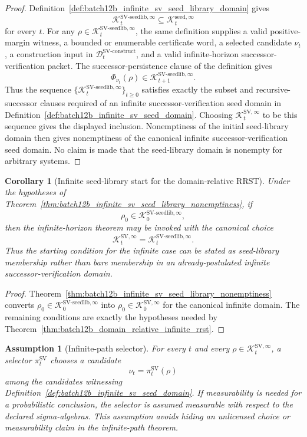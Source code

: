 \documentclass[11pt]{article}
\newtheorem{corollary}[theorem]{Corollary}
\newtheorem{assumption}[theorem]{Assumption}
\newcommand{\1}{\mathbf{1}}
\providecommand{\Dcal}{\mathcal{D}}
\providecommand{\Kcal}{\mathcal{K}}
\begin{document}
\begin{proof}
Definition~\ref{def:batch12b_infinite_sv_seed_library_domain} gives
\[
\Kcal_t^{\mathrm{SV\mbox{-}seedlib},\infty}
\subseteq
\Kcal_t^{\mathrm{seed},\infty}
\]
for every \(t\).  For any \(\rho\in\Kcal_t^{\mathrm{SV\mbox{-}seedlib},\infty}\), the same definition supplies a valid positive-margin witness, a bounded or enumerable certificate word, a selected candidate \(\nu_t\), a construction input in \(\Dcal_t^{\mathrm{SV\mbox{-}construct}}\), and a valid infinite-horizon successor-verification packet.  The successor-persistence clause of the definition gives
\[
\Phi_{\nu_t}(\rho)
\in
\Kcal_{t+1}^{\mathrm{SV\mbox{-}seedlib},\infty}.
\]
Thus the sequence \(\{\Kcal_t^{\mathrm{SV\mbox{-}seedlib},\infty}\}_{t\ge0}\) satisfies exactly the subset and recursive-successor clauses required of an infinite successor-verification seed domain in Definition~\ref{def:batch12b_infinite_sv_seed_domain}.  Choosing \(\Kcal_t^{\mathrm{SV},\infty}\) to be this sequence gives the displayed inclusion.  Nonemptiness of the initial seed-library domain then gives nonemptiness of the canonical infinite successor-verification seed domain.  No claim is made that the seed-library domain is nonempty for arbitrary systems.
\end{proof}

\begin{corollary}[Infinite seed-library start for the domain-relative RRST]
\label{cor:batch12b_infinite_seed_library_start_rrst}
Under the hypotheses of Theorem~\ref{thm:batch12b_infinite_sv_seed_library_nonemptiness}, if
\[
\rho_0\in\Kcal_0^{\mathrm{SV\mbox{-}seedlib},\infty},
\]
then the infinite-horizon theorem may be invoked with the canonical choice
\[
\Kcal_t^{\mathrm{SV},\infty}
=
\Kcal_t^{\mathrm{SV\mbox{-}seedlib},\infty}.
\]
Thus the starting condition for the infinite case can be stated as seed-library membership rather than bare membership in an already-postulated infinite successor-verification domain.
\end{corollary}

\begin{proof}
Theorem~\ref{thm:batch12b_infinite_sv_seed_library_nonemptiness} converts \(\rho_0\in\Kcal_0^{\mathrm{SV\mbox{-}seedlib},\infty}\) into \(\rho_0\in\Kcal_0^{\mathrm{SV},\infty}\) for the canonical infinite domain.  The remaining conditions are exactly the hypotheses needed by Theorem~\ref{thm:batch12b_domain_relative_infinite_rrst}.
\end{proof}

\begin{assumption}[Infinite-path selector]
\label{ass:batch12b_infinite_path_selector}
For every \(t\) and every \(\rho\in\Kcal_t^{\mathrm{SV},\infty}\), a selector \(\pi_t^{\mathrm{SV}}\) chooses a candidate
\[
\nu_t=\pi_t^{\mathrm{SV}}(\rho)
\]
among the candidates witnessing Definition~\ref{def:batch12b_infinite_sv_seed_domain}.  If measurability is needed for a probabilistic conclusion, the selector is assumed measurable with respect to the declared sigma-algebras.  This assumption avoids hiding an unlicensed choice or measurability claim in the infinite-path theorem.
\end{assumption}
\end{document}

